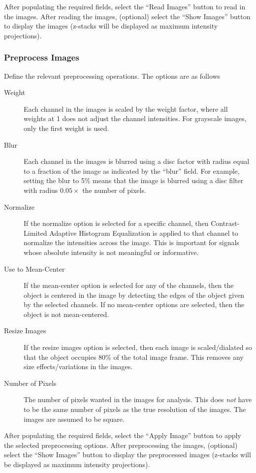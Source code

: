 \documentclass[12pt]{article}
\begin{document}
After populating the required fields, select the ``Read Images'' button to read in the images.
%
After reading the images, (optional) select the ``Show Images'' button to display the images (z-stacks will be displayed as maximum intensity projections).

\subsubsection{Preprocess Images}

Define the relevant preprocessing operations. 
%
The options are as follows
%
\begin{description}
\item[Weight] Each channel in the images is scaled by the weight factor, where all weights at 1 does not adjust the channel intensities. For grayscale images, only the first weight is used. 
%
\item[Blur] Each channel in the images is blurred using a disc factor with radius equal to a fraction of the image as indicated by the ``blur'' field. For example, setting the blur to 5\% means that the image is blurred using a disc filter with radius $0.05 \times$ the number of pixels. 
%
\item[Normalize] If the normalize option is selected for a specific channel, then Contrast-Limited Adaptive Histogram Equalization is applied to that channel to normalize the intensities across the image. This is important for signals whose absolute intensity is not meaningful or informative. 
%
\item[Use to Mean-Center] If the mean-center option is selected for any of the channels, then the object is centered in the image by detecting the edges of the object given by the selected channels. If no mean-center options are selected, then the object is not mean-centered.
%
\item[Resize Images] If the resize images option is selected, then each image is scaled/dialated so that the object occupies 80\% of the total image frame. This removes any size effects/variations in the images. 
%
\item[Number of Pixels] The number of pixels wanted in the images for analysis. This does {\em not} have to be the same number of pixels as the true resolution of the images. The images are assumed to be square. 
%
\end{description}

After populating the required fields, select the ``Apply Image'' button to apply the selected preprocessing options.
%
After preprocessing the images, (optional) select the ``Show Images'' button to display the preprocessed images (z-stacks will be displayed as maximum intensity projections).
\end{document}
